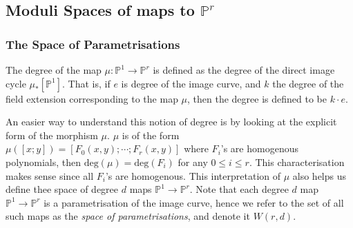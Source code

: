 \subsection{Moduli Spaces of maps to $\mathbb{P}^{r}$}

\subsubsection{The Space of Parametrisations}

\begin{definition}
    The degree of the map $\mu : \mathbb{P}^{1} \to \mathbb{P}^{r}$ is defined as the degree of the direct image cycle $\mu_{*}[\mathbb{P}^{1}]$.
    That is, if $e$ is degree of the image curve, and $k$ the degree of the field extension corresponding to the map $\mu$, then the degree is defined to be $k \cdot e$.
\end{definition}

An easier way to understand this notion of degree is by looking at the explicit form of the morphism $\mu$.
$\mu$ is of the form $\mu([x;y]) = [F_{0}(x,y);\cdots ; F_{r}(x,y)]$ where $F_{i}$'s are homogenous polynomials, then $\text{deg}(\mu) = \text{deg}(F_{i})$ for any $0 \leq i \leq r$. 
This characterisation makes sense since all $F_{i}$'s are homogenous.
This interpretation of $\mu$ also helps us define thee space of degree $d$ maps $\mathbb{P}^{1} \to \mathbb{P}^{r}$.
Note that each degree $d$ map $\mathbb{P}^{1} \to \mathbb{P}^{r}$ is a parametrisation of the image curve, hence we refer to the set of all such maps as the \textit{space of parametrisations}, and denote it $W(r,d)$. 

